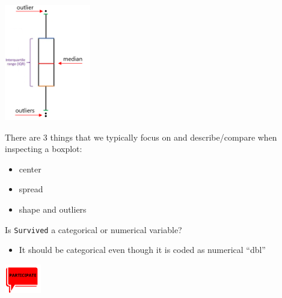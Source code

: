 \documentclass[
  letterpaper,
  DIV=11,
  numbers=noendperiod]{scrreprt}
\providecommand{\tightlist}{%
  \setlength{\itemsep}{0pt}\setlength{\parskip}{0pt}}\usepackage{longtable,booktabs,array}
\begin{document}
\begin{tcolorbox}[enhanced jigsaw, breakable, colback=white, bottomrule=.15mm, leftrule=.75mm, colframe=quarto-callout-note-color-frame, arc=.35mm, rightrule=.15mm, toprule=.15mm, left=2mm, opacityback=0]

\includegraphics[width=\textwidth,height=2in]{images/images_lecture/box_plot.png}

There are 3 things that we typically focus on and describe/compare when
inspecting a boxplot:

\begin{itemize}
\tightlist
\item
  center
\item
  spread
\item
  shape and outliers
\end{itemize}

\end{tcolorbox}

\begin{tcolorbox}[enhanced jigsaw, breakable, colback=white, bottomrule=.15mm, leftrule=.75mm, colframe=quarto-callout-important-color-frame, arc=.35mm, rightrule=.15mm, toprule=.15mm, left=2mm, opacityback=0]

Is \texttt{Survived} a categorical or numerical variable?

\begin{itemize}
\tightlist
\item
  It should be categorical even though it is coded as numerical ``dbl''
\end{itemize}

\includegraphics[width=\textwidth,height=0.5in]{images/images_lecture/participate_icon.png}

\end{tcolorbox}
\end{document}
